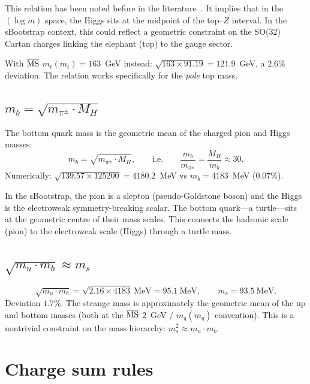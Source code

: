 \documentclass[11pt]{article}
\begin{document}
This relation has been noted before in the
literature~\cite{gm_higgs}.  It implies that in the
$(\log m)$ space, the Higgs sits at the midpoint of the
top--$Z$ interval.  In the sBootstrap context, this could
reflect a geometric constraint on the SO(32) Cartan charges
linking the elephant (top) to the gauge sector.

With $\overline{\rm MS}$ $m_t(m_t)=163$~GeV instead:
$\sqrt{163\times 91.19} = 121.9$~GeV, a $2.6\%$ deviation.
The relation works specifically for the \emph{pole} top mass.

\subsection{$m_b = \sqrt{m_{\pi^\pm}\cdot M_H}$}

The bottom quark mass is the geometric mean of the charged pion
and Higgs masses:
\begin{equation}
  \boxed{m_b = \sqrt{m_{\pi^\pm}\cdot M_H},
  \qquad\text{i.e.}\qquad
  \frac{m_b}{m_{\pi^\pm}} = \frac{M_H}{m_b} \approx 30.}
  \label{eq:b-geom}
\end{equation}
Numerically: $\sqrt{139.57\times 125200} = 4180.2$~MeV
vs $m_b = 4183$~MeV ($0.07\%$).

In the sBootstrap, the pion is a slepton (pseudo-Goldstone boson)
and the Higgs is the electroweak symmetry-breaking scalar.
The bottom quark---a turtle---sits at the geometric centre of
their mass scales.  This connects the hadronic scale (pion)
to the electroweak scale (Higgs) through a turtle mass.

\subsection{$\sqrt{m_u \cdot m_b} \approx m_s$}

\begin{equation}
  \sqrt{m_u \cdot m_b}
  = \sqrt{2.16\times 4183}~\text{MeV}
  = 95.1~\text{MeV},
  \qquad m_s = 93.5~\text{MeV}.
\end{equation}
Deviation $1.7\%$.  The strange mass is approximately the
geometric mean of the up and bottom masses (both at the
$\overline{\rm MS}$ $2$~GeV / $m_q(m_q)$ convention).
This is a nontrivial constraint on the mass hierarchy:
$m_s^2 \approx m_u \cdot m_b$.

\section{Charge sum rules}
\end{document}
